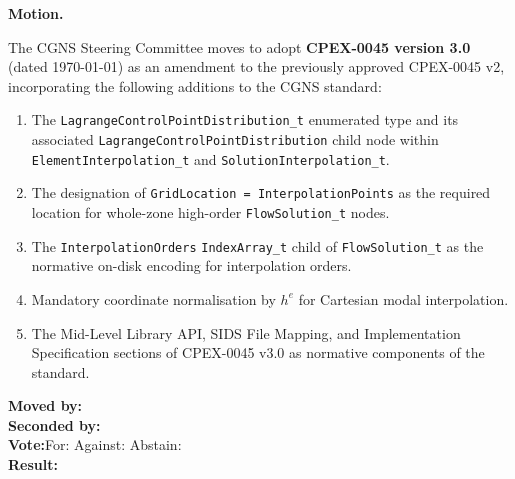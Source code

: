 \documentclass[11pt,letterpaper]{article}
\begin{document}
\begin{motionbox}
\textbf{Motion.}

The CGNS Steering Committee moves to adopt \textbf{CPEX-0045 version 3.0}
(dated \today) as an amendment to the previously approved CPEX-0045 v2,
incorporating the following additions to the CGNS standard:

\begin{enumerate}
  \item The \texttt{LagrangeControlPointDistribution\_t} enumerated type and its
    associated \texttt{LagrangeControlPointDistribution} child node within
    \texttt{ElementInterpolation\_t} and \texttt{SolutionInterpolation\_t}.
  \item The designation of \texttt{GridLocation = InterpolationPoints} as the required
    location for whole-zone high-order \texttt{FlowSolution\_t} nodes.
  \item The \texttt{InterpolationOrders} \texttt{IndexArray\_t} child of
    \texttt{FlowSolution\_t} as the normative on-disk encoding for interpolation orders.
  \item Mandatory coordinate normalisation by $h^e$ for Cartesian modal interpolation.
  \item The Mid-Level Library API, SIDS File Mapping, and Implementation Specification
    sections of CPEX-0045 v3.0 as normative components of the standard.
\end{enumerate}

\medskip
\noindent\textbf{Moved by:}\quad\underline{\hspace{6cm}}\\[0.8em]
\noindent\textbf{Seconded by:}\quad\underline{\hspace{5.5cm}}\\[0.8em]
\noindent\textbf{Vote:}\quad For:\underline{\hspace{1.5cm}}
          Against:\underline{\hspace{1.5cm}}
          Abstain:\underline{\hspace{1.5cm}}\\[0.8em]
\noindent\textbf{Result:}\quad\underline{\hspace{8cm}}
\end{motionbox}
\end{document}

